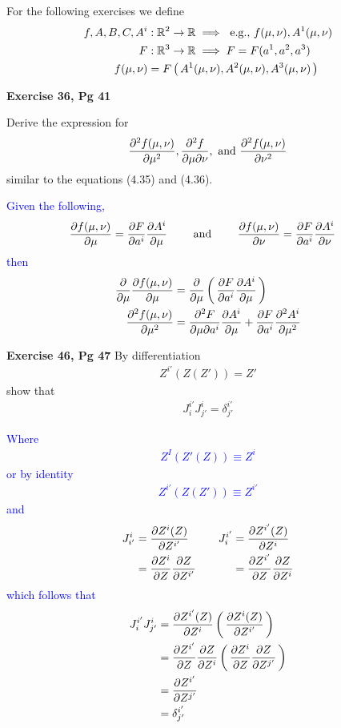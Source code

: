 \documentclass[12pt,a4paper]{report}
\newcommand{\BLUE}[1]{\textcolor{blue}{#1}}
\begin{document}
For the following exercises we define
\begin{align*}
	f, A, B, C, A^i &: \mathbb{R}^2 \to \mathbb{R} \implies \text{ e.g., } f(\mu,\nu), A^1(\mu,\nu) \\
	F &: \mathbb{R}^3 \to \mathbb{R} \implies F=F(a^1, a^2, a^3) \\
	f(\mu,\nu) &= F\left (\, A^1(\mu,\nu), A^2(\mu,\nu), A^3(\mu,\nu) \,\right )
\end{align*}
\begin{description}
	\item \textbf{Exercise 36, Pg 41}
	
	Derive the expression for 
	\begin{align*}
		\frac{\partial^2 f(\mu,\nu)}{\partial \mu^2}, \frac{\partial^2 f}{\partial\mu\partial\nu}, \text{ and } \frac{\partial^2 f(\mu,\nu)}{\partial \nu^2}
	\end{align*}similar to the equations (4.35) and (4.36).
	
	\BLUE{Given the following,\begin{align*}
		\frac{\partial f(\mu,\nu)}{\partial \mu} &= \frac{\partial F}{\partial a^i}\frac{\partial A^i}{\partial \mu} & \quad &\text{ and } & \quad 
		\frac{\partial f(\mu,\nu)}{\partial \nu} &= \frac{\partial F}{\partial a^i}\frac{\partial A^i}{\partial \nu} 
	\end{align*}then
	\begin{align*}
		\frac{\partial }{\partial \mu}\frac{\partial f(\mu,\nu)}{\partial \mu} &= \frac{\partial }{\partial \mu}\left (\, \frac{\partial F}{\partial a^i}\frac{\partial A^i}{\partial \mu} \,\right ) \\
		\frac{\partial^2 f(\mu,\nu)}{\partial \mu^2} &= \frac{\partial^2 F}{\partial \mu \partial a^i}\frac{\partial A^i}{\partial \mu}+\frac{\partial F}{\partial a^i}\frac{\partial^2 A^i}{\partial \mu^2} 
	\end{align*}
	}
	
	\item \textbf{Exercise 46, Pg 47}  By differentiation
	\begin{align*}
		Z^{i'}(Z(Z'))=Z'
	\end{align*}show that 
	\begin{align*}
		J_i^{i'}J_{j'}^i= \delta^{i'}_{j'}
	\end{align*}
	
	\BLUE{Where
	\begin{align*}
		Z^I(Z'(Z)) \equiv Z^i
	\end{align*}or by identity
	\begin{align*}
		Z^{i'}(Z(Z')) \equiv Z^{i'}
	\end{align*}and
	\begin{align*}
		J_{i'}^i &= \frac{\partial Z^i(Z)}{\partial Z^{i'}} & \quad
		J_i^{i'} &= \frac{\partial Z^{i'}(Z)}{\partial Z^i} \\
			&= \frac{\partial Z^i}{\partial Z}\frac{\partial Z}{\partial Z^{i'}} & \quad &= \frac{\partial Z^{i'}}{\partial Z}\frac{\partial Z}{\partial Z^i}
	\end{align*}which follows that
	\begin{align*}
		J_i^{i'}J_{j'}^i &= \frac{\partial Z^{i'}(Z)}{\partial Z^i}\left (\, \frac{\partial Z^i(Z)}{\partial Z^{i'}} \,\right ) \\
		&= \frac{\partial Z^{i'}}{\partial Z}\frac{\partial Z}{\partial Z^i}\left (\, \frac{\partial Z^i}{\partial Z}\frac{\partial Z}{\partial Z^{j'}} \,\right ) \\
		&= \frac{\partial Z^{i'}}{\partial Z^{j'}} \\
		&= \delta_{j'}^{i'}
	\end{align*}
	}
	

\end{description}
\end{document}
